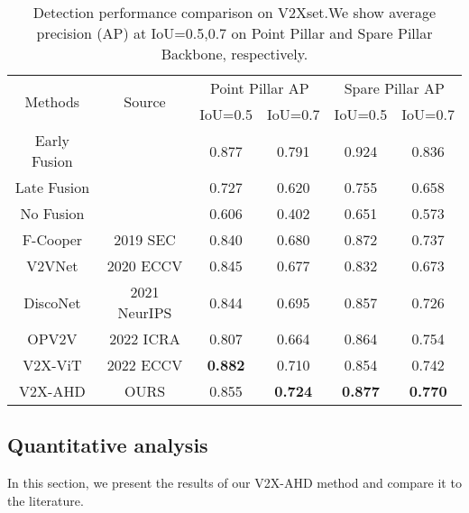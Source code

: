 \documentclass[lettersize,journal]{IEEEtran}
\begin{document}
\begin{table}
\renewcommand\arraystretch{1.8}
\tabcolsep=0.17cm
\caption{Detection performance comparison on V2Xset.We show average precision (AP) at IoU=0.5,0.7 on Point Pillar and Spare Pillar Backbone, respectively.}
\label{tab2}
\begin{tabular}{ c c c c c c} \hline
\multicolumn{1}{c}{\multirow{2}{*}{Methods}} &\multicolumn{1}{c}{\multirow{2}{*}{Source}}&\multicolumn{2}{c}{Point Pillar AP }&\multicolumn{2}{c}{Spare Pillar AP }\\ \cline{3-6}
&& IoU=0.5 & IoU=0.7 & IoU=0.5 & IoU=0.7 \\ \hline
Early Fusion& &0.877 & 0.791	& 0.924 & 0.836\\
Late Fusion& &0.727 & 0.620	& 0.755 & 0.658\\
No Fusion& &0.606 & 0.402	& 0.651 & 0.573\\\hline
F-Cooper\cite{26}&2019 SEC&0.840 & 0.680	& 0.872 & 0.737\\
V2VNet\cite{27} &2020 ECCV&0.845 & 0.677	& 0.832 & 0.673\\
DiscoNet\cite{13} &2021 NeurIPS&0.844 & 0.695	& 0.857 & 0.726\\
OPV2V\cite{28} &2022 ICRA&0.807 & 0.664	& 0.864 & 0.754\\
V2X-ViT\cite{8} &2022 ECCV&\textbf{0.882} & 0.710	& 0.854 & 0.742\\\hline
V2X-AHD &OURS&0.855 &\textbf{ 0.724}	& \textbf{0.877} &\textbf{ 0.770}\\\hline
\end{tabular}
\end{table}







\subsection{Quantitative analysis}
In this section, we present the results of our V2X-AHD method and compare it to the literature.
\end{document}
